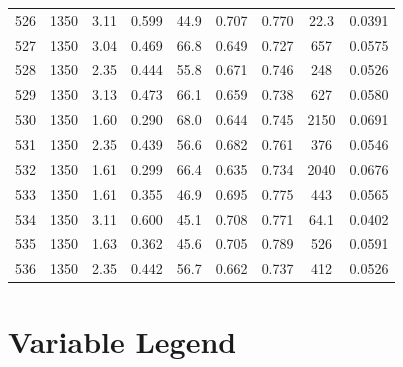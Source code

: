 \documentclass[11pt,twocolumn]{article}
\begin{document}
\begin{minipage}{\textwidth}
\begin{tabulary}{\linewidth}{C C C C C C C C C}
526    &       1350 &            3.11 &    0.599 &      44.9 &       0.707 &      0.770 &              22.3 &        0.0391 \\
527    &       1350 &            3.04 &    0.469 &      66.8 &       0.649 &      0.727 &             657 &          0.0575 \\
528    &       1350 &            2.35 &    0.444 &      55.8 &       0.671 &      0.746 &             248 &          0.0526 \\
529    &       1350 &            3.13 &    0.473 &      66.1 &       0.659 &      0.738 &             627 &          0.0580 \\
530    &       1350 &            1.60 &    0.290 &      68.0 &       0.644 &      0.745 &             2150 &        0.0691 \\
531    &       1350 &            2.35 &    0.439 &      56.6 &       0.682 &      0.761 &             376 &          0.0546 \\
532    &       1350 &            1.61 &    0.299 &      66.4 &       0.635 &      0.734 &             2040 &        0.0676 \\
533    &       1350 &            1.61 &    0.355 &      46.9 &       0.695 &      0.775 &             443 &          0.0565 \\
534    &       1350 &            3.11 &    0.600 &      45.1 &       0.708 &      0.771 &             64.1 &         0.0402 \\
535    &       1350 &            1.63 &    0.362 &      45.6 &       0.705 &      0.789 &             526 &          0.0591 \\
536    &       1350 &            2.35 &    0.442 &      56.7 &       0.662 &      0.737 &             412 &          0.0526 \\
\bottomrule
\end{tabulary}
\end{minipage}


\section{Variable Legend}
\label{app_var}
\end{document}
